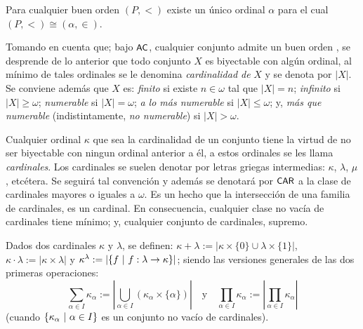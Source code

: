     \begin{teorema}[de enumeración]\label{teo-enumeracion}
        Para cualquier buen orden $(P,<)$ existe un único ordinal $\alpha$ para el cual $(P,<) \cong (\alpha, \in)$.
    \end{teorema}

    Tomando en cuenta que; bajo $\text{\textsf{\small AC}}$, cualquier conjunto admite un buen orden \cite[Teo.~5.1, p.~48]{jechSet}, se desprende de lo anterior que todo conjunto $X$ es biyectable con algún ordinal, al mínimo de tales ordinales se le denomina \textit{cardinalidad de} $X$ y se denota por $|X|$. Se conviene además que $X$ es: \textit{finito} si existe $n \in \omega$ tal que $|X|=n$; \textit{infinito} si $|X|\geq \omega$; \textit{numerable} si $|X|=\omega$; \textit{a lo más numerable} si $|X|\leq \omega$; y, \textit{más que numerable} (indistintamente, \textit{no numerable}) si $|X|>\omega$.
    
    \index[sym]{$\CAR$}
    Cualquier ordinal $\kappa$ que sea la cardinalidad de un conjunto tiene la virtud de no ser biyectable con ningun ordinal anterior a él, a estos ordinales se les llama \textit{cardinales}. Los cardinales se suelen denotar por letras griegas intermedias: $\kappa$, $\lambda$, $\mu$, etcétera. Se seguirá tal convención y además se denotará por $\CAR$ a la clase de cardinales mayores o iguales a $\omega$. Es un hecho que la intersección de una familia de cardinales, es un cardinal. En consecuencia, cualquier clase no vacía de cardinales tiene mínimo; y, cualquier conjunto de cardinales, supremo.

    \index[sym]{$\kappa + \lambda$}\index[sym]{$\kappa \cdot \lambda$}\index[sym]{$\kappa ^ \lambda$}
    Dados dos cardinales $\kappa$ y $\lambda$, se definen: $\kappa + \lambda:=|\kappa \times \{0\} \cup \lambda \times \{1\}|$, $\kappa \cdot \lambda:= |\kappa \times \lambda|$ y $\kappa ^ \lambda:= |\{f \text{ $|$ } f:\lambda \to \kappa\}|$; siendo las versiones generales de las dos primeras operaciones:
    \[ \sum_{\alpha \in I} \kappa_\alpha := \left|\bigcup_{\alpha \in I} (\kappa_\alpha \times \{\alpha\})\right| \quad \text{y} \quad \prod_{\alpha \in I} \kappa_\alpha := \left|\prod_{\alpha \in I} \kappa_\alpha\right| \]
    (cuando $\{\kappa_\alpha \text{ $|$ } \alpha \in I\}$ es un conjunto no vacío de cardinales).

